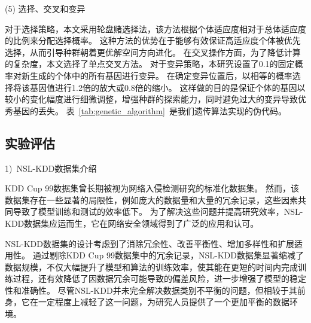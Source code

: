 (5) 选择、交叉和变异\par
对于选择策略，本文采用轮盘赌选择法，该方法根据个体适应度相对于总体适应度的比例来分配选择概率。
这种方法的优势在于能够有效保证高适应度个体被优先选择，从而引导种群朝着更优解空间方向进化。
在交叉操作方面，为了降低计算的复杂度，本文选择了单点交叉方法。
对于变异策略，本研究设置了0.1的固定概率对新生成的个体中的所有基因进行变异。
在确定变异位置后，以相等的概率选择将该基因值进行1.2倍的放大或0.8倍的缩小。
这样做的目的是保证个体的基因以较小的变化幅度进行细微调整，增强种群的探索能力，同时避免过大的变异导致优秀基因的丢失。
表~\ref{tab:genetic_algorithm}~是我们遗传算法实现的伪代码。



\subsection{实验评估}
1)~NSL-KDD数据集介绍\par
KDD Cup 99数据集\cite{tavallaee2009detailed}曾长期被视为网络入侵检测研究的标准化数据集。
然而，该数据集存在一些显著的局限性，例如庞大的数据量和大量的冗余记录，这些因素共同导致了模型训练和测试的效率低下。
为了解决这些问题并提高研究效率，NSL-KDD数据集\cite{revathi2013detailed}应运而生，它在网络安全领域得到了广泛的应用和认可。


NSL-KDD数据集的设计考虑到了消除冗余性、改善平衡性、增加多样性和扩展适用性。
通过剔除KDD Cup 99数据集中的冗余记录，NSL-KDD数据集显著缩减了数据规模，不仅大幅提升了模型和算法的训练效率，使其能在更短的时间内完成训练过程，还有效降低了因数据冗余可能导致的偏差风险，进一步增强了模型的稳定性和准确性。
尽管NSL-KDD并未完全解决数据类别不平衡的问题，但相较于其前身，它在一定程度上减轻了这一问题，为研究人员提供了一个更加平衡的数据环境。


